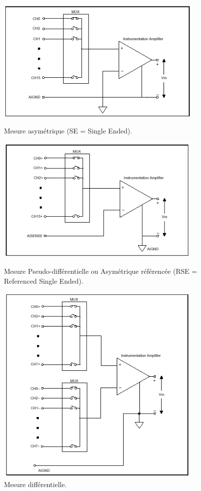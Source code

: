 \begin{figure}[p]
    \centering
    \vspace{-17mm}
	\includegraphics[width=10cm]{assets/figures/2_10_Mesure_asymetrique.PNG}
	\caption{Mesure asymétrique (SE = Single Ended).}
	\label{fig:Mesure_asymetrique}
    \centering
	\includegraphics[width=10cm]{assets/figures/2_11_Mesure_Pseudo_differentielle.PNG}
	\caption{Mesure Pseudo-différentielle ou Asymétrique référencée (RSE = Referenced Single Ended).}
	\label{fig:Mesure_Pseudo_differentielle}
    \centering
	\includegraphics[width=10cm]{assets/figures/2_12_Mesure_differentielle.PNG}
	\caption{Mesure différentielle.}
	\label{fig:Mesure_differentielle}
\end{figure}

